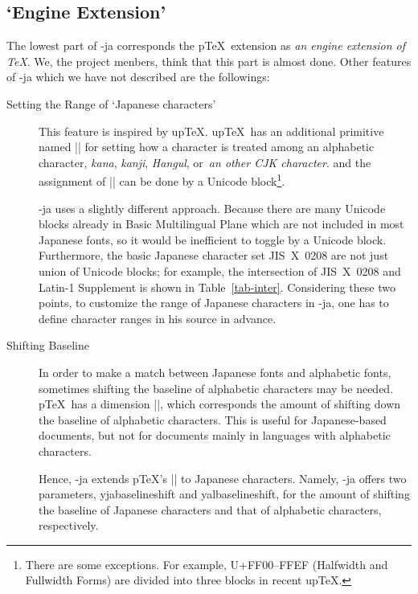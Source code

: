 \documentclass{ajt}
\begin{document}
\subsection{`Engine Extension'}
The lowest part of \LuaTeX-ja corresponds the p\TeX\ extension as
\emph{an engine extension of \TeX}. We, the project menbers, think that
this part is almost done. Other features of \LuaTeX-ja which we have not
described are the followings:
\begin{description}
\item[Setting the Range of `Japanese characters'] This feature is
	   inspired by up\TeX. up\TeX\ has an additional primitive named
	   |\kcatcode| for setting how a character is treated among an
	   alphabetic character, \emph{kana}, \emph{kanji},
	   \emph{Hangul}, or~\emph{an other CJK character}. and the
	   assignment of |\kcatcode| can be done by a Unicode
	   block\footnote{There are some exceptions. For example,
	   U+FF00--FFEF (Halfwidth and Fullwidth Forms) are divided into
	   three blocks in recent up\TeX.}.

\LuaTeX-ja uses a slightly different approach. Because there are many
	   Unicode blocks already in Basic Multilingual Plane which are
	   not included in most Japanese fonts, so it would be
	   inefficient to toggle by a Unicode block.  Furthermore, the
	   basic Japanese character set JIS~X~0208 are not just union of
	   Unicode blocks; for example, the intersection of JIS~X~0208
	   and Latin-1 Supplement is shown in Table~\ref{tab-inter}.
	   Considering these two points, to customize the range of
	   Japanese characters in \LuaTeX-ja, one has to define
	   character ranges in his source in advance.

\item[Shifting Baseline]
In order to make a match between Japanese fonts and alphabetic fonts,
	   sometimes shifting the baseline of alphabetic characters may
	   be needed. p\TeX\ has a dimension |\ybaselineshift|, which
	   corresponds the amount of shifting down the baseline of alphabetic
	   characters. This is useful for Japanese-based documents, but
	   not for documents mainly in languages with alphabetic
	   characters.

Hence, \LuaTeX-ja extends p\TeX's |\ybaselineshift| to Japanese
	   characters. Namely, \LuaTeX-ja offers two parameters,
	   \textsf{yjabaselineshift} and \textsf{yalbaselineshift}, for the
	   amount of shifting the baseline of Japanese characters and
	   that of alphabetic characters, respectively. 


\end{description}
\end{document}
